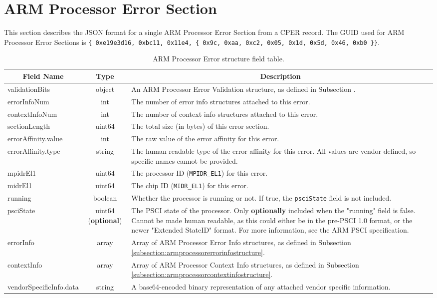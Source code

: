 \documentclass{report}
\newcommand*{\thead}[1]{\multicolumn{1}{|c|}{\bfseries #1}}
\newcommand*{\jsontable}[1]{
    \begin{table}[!ht]
    \label{#1}
    \centering
    \begin{adjustbox}{center}
    \begin{tabular}{|l|c|p{8cm}|}
    \hline
    \thead{Field Name} & \thead{Type} & \thead{Description} \\
    \hline
}
\newcommand*{\jsontableend}[1]{
    \hline
    \end{tabular}
    \end{adjustbox}
    \caption{#1}
    \label{table:#1}
    \end{table}
    \FloatBarrier
}
\begin{document}
\section{ARM Processor Error Section}
\label{section:armprocessorerrorsection}
This section describes the JSON format for a single ARM Processor Error Section from a CPER record. The GUID used for ARM Processor Error Sections is \texttt{\{ 0xe19e3d16, 0xbc11, 0x11e4, \{ 0x9c, 0xaa, 0xc2, 0x05, 0x1d, 0x5d, 0x46, 0xb0 \}\}}.
\jsontable{table:armprocessorerrorsection}
validationBits & object & An ARM Processor Error Validation structure, as defined in Subsection .\\
\hline
errorInfoNum & int & The number of error info structures attached to this error.\\
\hline
contextInfoNum & int & The number of context info structures attached to this error.\\
\hline
sectionLength & uint64 & The total size (in bytes) of this error section.\\
\hline
errorAffinity.value & int & The raw value of the error affinity for this error.\\
errorAffinity.type & string & The human readable type of the error affinity for this error. All values are vendor defined, so specific names cannot be provided.\\
\hline
mpidrEl1 & uint64 & The processor ID (\texttt{MPIDR\_EL1}) for this error.\\
\hline
midrEl1 & uint64 & The chip ID (\texttt{MIDR\_EL1}) for this error.\\
\hline
running & boolean & Whether the processor is running or not. If true, the \texttt{psciState} field is not included.\\
\hline
psciState & uint64 (\textbf{optional}) & The PSCI state of the processor. Only \textbf{optionally} included when the "running" field is false. Cannot be made human readable, as this could either be in the pre-PSCI 1.0 format, or the newer "Extended StateID" format. For more information, see the ARM PSCI specification.\\
\hline
errorInfo & array & Array of ARM Processor Error Info structures, as defined in Subsection \ref{subsection:armprocessorerrorinfostructure}.\\
\hline
contextInfo & array & Array of ARM Processor Context Info structures, as defined in Subsection \ref{subsection:armprocessorcontextinfostructure}.\\
\hline
vendorSpecificInfo.data & string & A base64-encoded binary representation of any attached vendor specific information.\\
\jsontableend{ARM Processor Error structure field table.}
\end{document}
